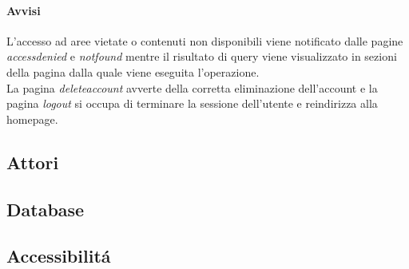 \paragraph{Avvisi}
L'accesso ad aree vietate o contenuti non disponibili viene notificato dalle pagine \textit{accessdenied} e \textit{notfound} mentre il risultato di query viene visualizzato in sezioni della pagina dalla quale viene eseguita l'operazione.\\
La pagina \textit{deleteaccount} avverte della corretta eliminazione dell'account e la pagina \textit{logout} si occupa di terminare la sessione dell'utente e reindirizza alla homepage.

\subsection{Attori}
\subsection{Database}
\subsection{Accessibilitá}

